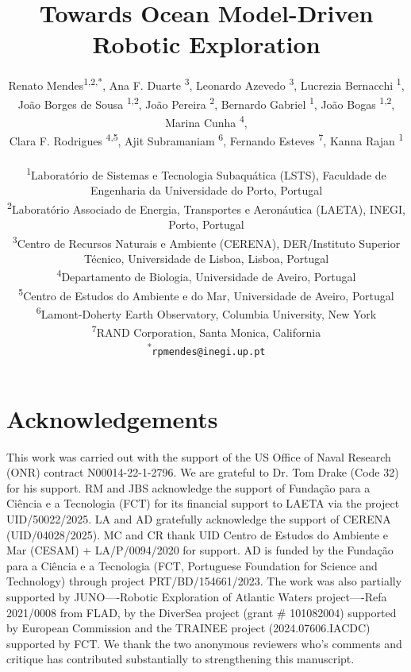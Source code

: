 \documentclass[11pt]{article}
\title{Towards Ocean Model-Driven Robotic Exploration}
\author{
Renato Mendes\textsuperscript{1,2,*},
Ana F. Duarte \textsuperscript{3},
Leonardo Azevedo \textsuperscript{3},
Lucrezia Bernacchi \textsuperscript{1},\\
Jo\~{a}o Borges de Sousa \textsuperscript{1,2},
Jo\~{a}o Pereira \textsuperscript{2},
Bernardo Gabriel \textsuperscript{1},
Jo\~{a}o Bogas \textsuperscript{1,2},
Marina Cunha \textsuperscript{4},\\
Clara F. Rodrigues \textsuperscript{4,5},
Ajit Subramaniam \textsuperscript{6},
Fernando Esteves \textsuperscript{7},
Kanna Rajan \textsuperscript{1}
\\
\\
\textsuperscript{1}{\scriptsize Laborat{\'o}rio de Sistemas e Tecnologia Subaqu{\'a}tica (LSTS), Faculdade de Engenharia da Universidade do Porto, Portugal}\\
\textsuperscript{2}{\scriptsize Laborat{\'o}rio Associado de Energia, Transportes e Aeron{\'a}utica (LAETA), INEGI, Porto, Portugal}\\
\textsuperscript{3}{\scriptsize Centro de Recursos Naturais e Ambiente (CERENA), DER/Instituto Superior T\'{e}cnico, Universidade de Lisboa, Lisboa, Portugal}\\
\textsuperscript{4}{\scriptsize Departamento de Biologia, Universidade de Aveiro, Portugal}\\
\textsuperscript{5}{\scriptsize Centro de Estudos do Ambiente e do Mar, Universidade de Aveiro, Portugal}\\
\textsuperscript{6}{\scriptsize Lamont-Doherty Earth Observatory, Columbia University, New York}\\
\textsuperscript{7}{\scriptsize RAND Corporation, Santa Monica, California}\\
\textsuperscript{*}\texttt{{\scriptsize rpmendes@inegi.up.pt}}
}
\date{}
\begin{document}
\maketitle
\begin{onehalfspace}







\end{onehalfspace}

\section{Acknowledgements}

This work was carried out with the support of the US Office of Naval
Research (ONR) contract N00014-22-1-2796. We are grateful to Dr. Tom
Drake (Code 32) for his support. RM and JBS acknowledge the support of
Fundação para a Ciência e a Tecnologia (FCT) for its financial support
to LAETA via the project UID/50022/2025.  LA and AD gratefully
acknowledge the support of CERENA (UID/04028/2025). MC and CR thank
UID Centro de Estudos do Ambiente e Mar (CESAM) + LA/P/0094/2020 for
support. AD is funded by the Funda\c{c}\~{a}o para a Ci\^{e}ncia e a
Tecnologia (FCT, Portuguese Foundation for Science and Technology)
through project PRT/BD/154661/2023. The work was also partially
supported by JUNO—-Robotic Exploration of Atlantic Waters
project—-Refa 2021/0008 from FLAD, by the DiverSea project (grant \#
101082004) supported by European Commission and the TRAINEE project
(2024.07606.IACDC) supported by FCT. We thank the two anonymous reviewers who’s comments and critique has contributed substantially to strengthening this manuscript.

%
%  

\footnotesize
\printbibliography


\end{document}
